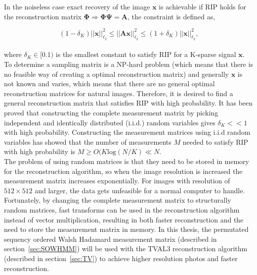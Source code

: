 In the noiseless case exact recovery of the image $\mathbf{x}$ is achievable if RIP holds for the reconstruction matrix $\mathbf{\Phi} \Rightarrow \mathbf{\Phi\Psi = A}$, the constraint is defined as,

\begin{equation}
    (1-\delta_K)||\mathbf{x}||_{\ell_2}^2\leq||\mathbf{Ax}||_{\ell_2}^2\leq(1+\delta_K)||\mathbf{x}||_{\ell_2}^2 \text{,}
\end{equation}\\[0.1in]

where $\delta_K \in [0.1)$ is the smallest constant to satisfy RIP for a K-sparse signal $\mathbf{x}$. To determine a sampling matrix is a NP-hard problem (which means that there is no feasible way of creating a optimal reconstruction matrix) and generally $\textbf{x}$ is not known and varies, which means that there are no general optimal reconstruction matrices for natural images. Therefore, it is desired to find a general reconstruction matrix that satisfies RIP with high probability. It has been proved that constructing the complete measurement matrix by picking independent and identically distributed (i.i.d.) random variables gives $\delta_K << 1$ with high probability. Constructing the measurement matrices using i.i.d random variables has showed that the number of measurements $M$ needed to satisfy RIP with high probability is $M \geq O(K\text{log}(N/K) \ll N$. \cite{book:srr}\\[0.1in]

The problem of using random matrices is that they need to be stored in memory for the reconstruction algorithm, so when the image resolution is increased the measurement matrix increases exponentially. For images with resolution of $512\times 512$ and larger, the data gets unfeasible for a normal computer to handle.\\[0.1in]  

Fortunately, by changing the complete measurement matrix to structurally random matrices, fast transforms can be used in the reconstruction algorithm instead of vector multiplication, resulting in both faster reconstruction and the need to store the measurement matrix in memory. In this thesis, the permutated sequency ordered Walsh Hadamard measurement matrix (described in section~\ref{sec:SOWHMM}) will be used with the TVAL3 reconstruction algorithm (described in section~\ref{sec:TV}) to achieve higher resolution photos and faster reconstruction.   


